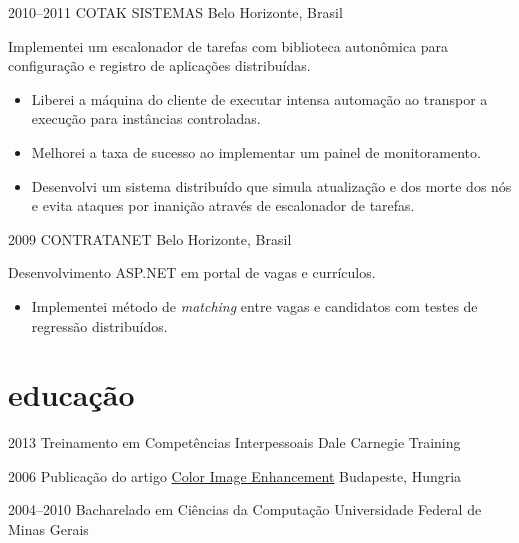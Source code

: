 \documentclass[]{friggeri-cv}
\begin{document}
\begin{entrylist}
\entry
{2010--2011}
{COTAK SISTEMAS}
{Belo Horizonte, Brasil}
{ Implementei um escalonador de tarefas com biblioteca autonômica para configuração e registro de aplicações distribuídas.

  \begin{itemize}
    \item Liberei a máquina do cliente de executar intensa automação ao transpor a execução para instâncias controladas.
    \item Melhorei a taxa de sucesso ao implementar um painel de monitoramento.
    \item Desenvolvi um sistema distribuído que simula atualização e dos morte dos nós e evita ataques por inanição através de escalonador de tarefas.
  \end{itemize}
}

\entry
{2009}
{CONTRATANET}
{Belo Horizonte, Brasil}
{ Desenvolvimento ASP.NET em portal de vagas e currículos.
\begin{itemize}
  \item Implementei método de \textit{matching} entre vagas e candidatos com testes de regressão distribuídos.
  \end{itemize}
}

\end{entrylist}

\section{educação}

\begin{entrylist}

\entry
{2013}
{{\normalfont Treinamento em} Competências Interpessoais}
{Dale Carnegie Training}


\entry
{2006}
{Publicação do artigo { \normalfont \href{http://goo.gl/iwGso6}{Color Image Enhancement}}}
{Budapeste, Hungria}

\entry
{2004--2010}
{{\normalfont Bacharelado em} Ciências da Computação}
{Universidade Federal de Minas Gerais}


\end{entrylist}
\end{document}
